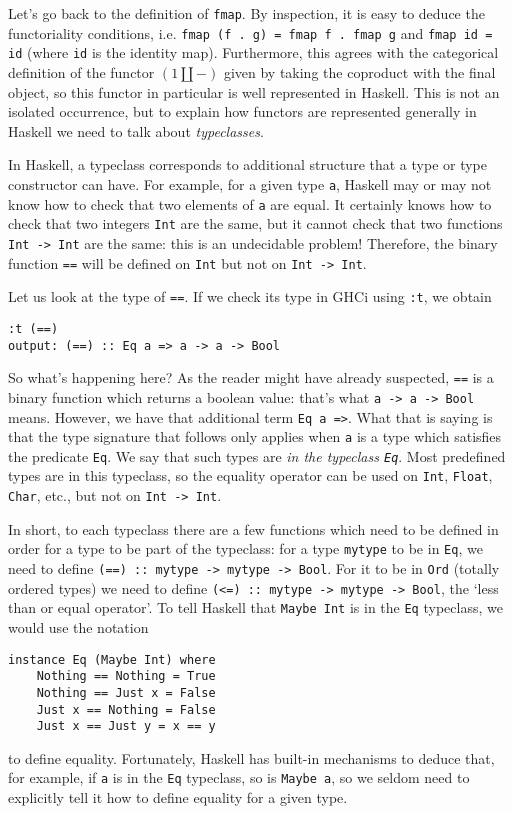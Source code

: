 \documentclass[11	pt]{article}
\theoremstyle{nonumberplain}
\newcommand{\blank}{{-}}
\newcommand*\lsin{\lstinline}
\begin{document}
Let's go back to the definition of \lsin|fmap|. By inspection, it is easy to deduce the functoriality conditions, i.e. \lsin|fmap (f . g) = fmap f . fmap g| and \lsin|fmap id = id| (where \lsin|id| is the identity map). Furthermore, this agrees with the categorical definition of the functor $(1 \amalg \blank)$ given by taking the coproduct with the final object, so this functor in particular is well represented in Haskell. This is not an isolated occurrence, but to explain how functors are represented generally in Haskell we need to talk about \emph{typeclasses}.

In Haskell, a typeclass corresponds to additional structure that a type or type constructor can have. For example, for a given type \lsin|a|, Haskell may or may not know how to check that two elements of \lsin|a| are equal. It certainly knows how to check that two integers \lsin|Int| are the same, but it cannot check that two functions \lsin|Int -> Int| are the same: this is an undecidable problem! Therefore, the binary function \lsin|==| will be defined on \lsin|Int| but not on \lsin|Int -> Int|.

Let us look at the type of \lsin|==|. If we check its type in GHCi using \lsin|:t|, we obtain
\begin{lstlisting}
:t (==)
output: (==) :: Eq a => a -> a -> Bool
\end{lstlisting}

So what's happening here? As the reader might have already suspected, \lsin|==| is a binary function which returns a boolean value: that's what \lsin|a -> a -> Bool| means. However, we have that additional term \lsin|Eq a =>|. What that is saying is that the type signature that follows only applies when \lsin|a| is a type which satisfies the predicate \lsin|Eq|. We say that such types are \emph{in the typeclass \lsin|Eq|}. Most predefined types are in this typeclass, so the equality operator can be used on \lsin|Int|, \lsin|Float|, \lsin|Char|, etc., but not on \lsin|Int -> Int|.

In short, to each typeclass there are a few functions which need to be defined in order for a type to be part of the typeclass: for a type \lsin|mytype| to be in \lsin|Eq|, we need to define \lsin|(==) :: mytype -> mytype -> Bool|. For it to be in \lsin|Ord| (totally ordered types) we need to define \lsin|(<=) :: mytype -> mytype -> Bool|, the `less than or equal operator'. To tell Haskell that \lsin|Maybe Int| is in the \lsin|Eq| typeclass, we would use the notation
\begin{lstlisting}
instance Eq (Maybe Int) where
    Nothing == Nothing = True
    Nothing == Just x = False
    Just x == Nothing = False
    Just x == Just y = x == y
\end{lstlisting}
to define equality. Fortunately, Haskell has built-in mechanisms to deduce that, for example, if \lsin|a| is in the \lsin|Eq| typeclass, so is \lsin|Maybe a|, so we seldom need to explicitly tell it how to define equality for a given type.
\end{document}
